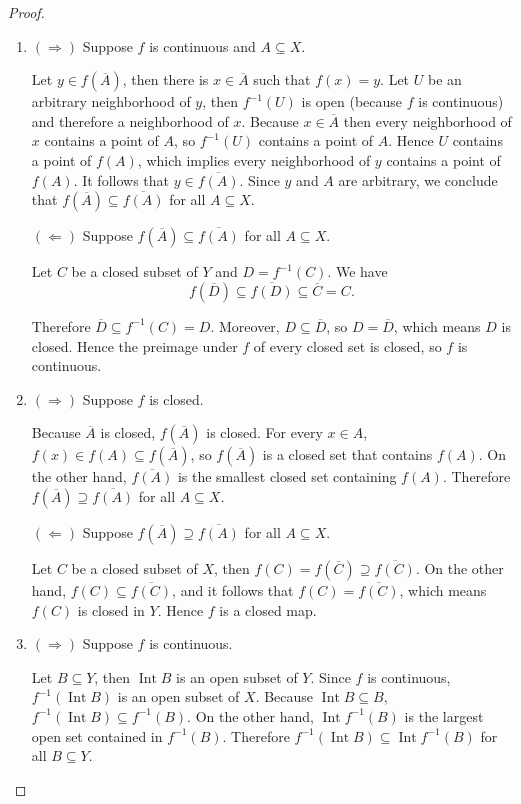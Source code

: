 \begin{proof}
	\begin{enumerate}[label={(\alph*)}]
		\item $(\Longrightarrow)$ Suppose $f$ is continuous and $A\subseteq X$.

		      Let $y\in f(\overline{A})$, then there is $x\in\overline{A}$ such that $f(x) = y$. Let $U$ be an arbitrary neighborhood of $y$, then $f^{-1}(U)$ is open (because $f$ is continuous) and therefore a neighborhood of $x$. Because $x\in\overline{A}$ then every neighborhood of $x$ contains a point of $A$, so $f^{-1}(U)$ contains a point of $A$. Hence $U$ contains a point of $f(A)$, which implies every neighborhood of $y$ contains a point of $f(A)$. It follows that $y\in \overline{f(A)}$. Since $y$ and $A$ are arbitrary, we conclude that $f(\overline{A})\subseteq \overline{f(A)}$ for all $A\subseteq X$.

		      $(\Longleftarrow)$ Suppose $f(\overline{A})\subseteq \overline{f(A)}$ for all $A\subseteq X$.

		      Let $C$ be a closed subset of $Y$ and $D = f^{-1}(C)$. We have
		      \[
			      f(\overline{D})\subseteq \overline{f(D)} \subseteq \overline{C} = C.
		      \]

		      Therefore $\overline{D}\subseteq f^{-1}(C) = D$. Moreover, $D\subseteq \overline{D}$, so $D = \overline{D}$, which means $D$ is closed. Hence the preimage under $f$ of every closed set is closed, so $f$ is continuous.
		\item $(\Longrightarrow)$  Suppose $f$ is closed.

		      Because $\overline{A}$ is closed, $f(\overline{A})$ is closed. For every $x\in A$, $f(x)\in f(A)\subseteq f(\overline{A})$, so $f(\overline{A})$ is a closed set that contains $f(A)$. On the other hand, $\overline{f(A)}$ is the smallest closed set containing $f(A)$. Therefore $f(\overline{A})\supseteq \overline{f(A)}$ for all $A\subseteq X$.

		      $(\Longleftarrow)$ Suppose $f(\overline{A})\supseteq \overline{f(A)}$ for all $A\subseteq X$.

		      Let $C$ be a closed subset of $X$, then $f(C) = f(\overline{C}) \supseteq \overline{f(C)}$. On the other hand, $f(C)\subseteq \overline{f(C)}$, and it follows that $f(C) = \overline{f(C)}$, which means $f(C)$ is closed in $Y$. Hence $f$ is a closed map.
		\item $(\Longrightarrow)$ Suppose $f$ is continuous.

		      Let $B\subseteq Y$, then $\operatorname{Int} B$ is an open subset of $Y$. Since $f$ is continuous, $f^{-1}(\operatorname{Int} B)$ is an open subset of $X$. Because $\operatorname{Int} B\subseteq B$, $f^{-1}(\operatorname{Int} B) \subseteq f^{-1}(B)$. On the other hand, $\operatorname{Int}f^{-1}(B)$ is the largest open set contained in $f^{-1}(B)$. Therefore $f^{-1}(\operatorname{Int}B) \subseteq \operatorname{Int}f^{-1}(B)$ for all $B\subseteq Y$.


\end{enumerate}
\end{proof}
